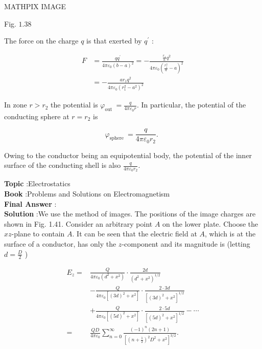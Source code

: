 \documentclass[10pt]{article}
\begin{document}
MATHPIX IMAGE

Fig. $1.38$

The force on the charge $q$ is that exerted by $q^{\prime}$ :

$$
\begin{aligned}
F &=\frac{q q^{\prime}}{4 \pi \varepsilon_{0}(b-a)^{2}}=-\frac{\frac{r_{1}}{a} q^{2}}{4 \pi \varepsilon_{0}\left(\frac{r_{1}^{2}}{a}-a\right)^{2}} \\
&=-\frac{a r_{1} q^{2}}{4 \pi \varepsilon_{0}\left(r_{1}^{2}-a^{2}\right)^{2}}
\end{aligned}
$$

In zone $r>r_{2}$ the potential is $\varphi_{\text {out }}=\frac{q}{4 \pi \varepsilon_{0} r}$. In particular, the potential of the conducting sphere at $r=r_{2}$ is

$$
\varphi_{\text {sphere }}=\frac{q}{4 \pi \varepsilon_{0} r_{2}} \text {. }
$$

Owing to the conductor being an equipotential body, the potential of the inner surface of the conducting shell is also $\frac{q}{4 \pi \varepsilon_{0} r_{2}}$.


\textbf{Topic} :Electrostatics\\
\textbf{Book} :Problems and Solutions on Electromagnetism\\
\textbf{Final Answer} :\\


\textbf{Solution} :We use the method of images. The positions of the image charges are shown in Fig. 1.41. Consider an arbitrary point $A$ on the lower plate. Choose the $x z$-plane to contain $A$. It can be seen that the electric field at $A$, which is at the surface of a conductor, has only the $z$-component and its magnitude is (letting $d=\frac{D}{2}$ )

$$
\begin{aligned}
E_{z}=& \frac{Q}{4 \pi \varepsilon_{0}\left(d^{2}+x^{2}\right)} \cdot \frac{2 d}{\left(d^{2}+x^{2}\right)^{1 / 2}} \\
&-\frac{Q}{4 \pi \varepsilon_{0}\left[(3 d)^{2}+x^{2}\right]} \cdot \frac{2 \cdot 3 d}{\left[(3 d)^{2}+x^{2}\right]^{1 / 2}} \\
&+\frac{Q}{4 \pi \varepsilon_{0}\left[(5 d)^{2}+x^{2}\right]} \cdot \frac{2 \cdot 5 d}{\left[(5 d)^{2}+x^{2}\right]^{1 / 2}}-\cdots \\
=& \frac{Q D}{4 \pi \varepsilon_{0}} \sum_{n=0}^{\infty} \frac{(-1)^{n}(2 n+1)}{\left[\left(n+\frac{1}{2}\right)^{2} D^{2}+x^{2}\right]^{3 / 2}} .
\end{aligned}
$$
\end{document}
